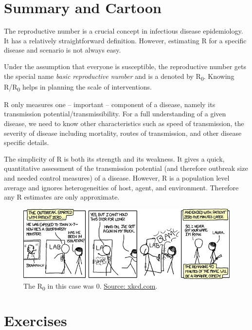 \documentclass[]{book}
\theoremstyle{definition}
\theoremstyle{definition}
\theoremstyle{definition}
\theoremstyle{remark}
\begin{document}
\section{Summary and Cartoon}\label{summary-and-cartoon-3}

The reproductive number is a crucial concept in infectious disease
epidemiology. It has a relatively straightforward definition. However,
estimating R for a specific disease and scenario is not always easy.

Under the assumption that everyone is susceptible, the reproductive
number gets the special name \emph{basic reproductive number} and is a
denoted by R\textsubscript{0}. Knowing R/R\textsubscript{0} helps in
planning the scale of interventions.

R only measures one -- important -- component of a disease, namely its
transmission potential/transmissibility. For a full understanding of a
given disease, we need to know other characteristics such as speed of
transmission, the severity of disease including mortality, routes of
transmission, and other disease specific details.

The simplicity of R is both its strength and its weakness. It gives a
quick, quantitative assessment of the transmission potential (and
therefore outbreak size and needed control measures) of a disease.
However, R is a population level average and ignores heterogeneities of
host, agent, and environment. Therefore any R estimates are only
approximate.

\begin{figure}
\centering
\includegraphics{./images/xkcd-outbreak-control.png}
\caption{\label{fig:xkcd-outbreak-control}The R\textsubscript{0} in this
case was 0. \href{https://xkcd.com/734/}{Source: xkcd.com}.}
\end{figure}

\section{Exercises}\label{exercises-3}
\end{document}
